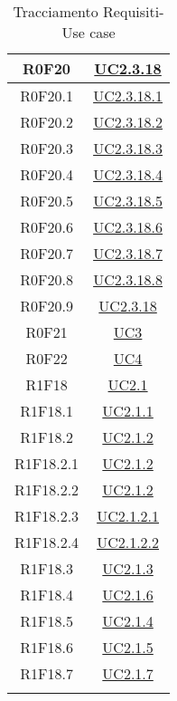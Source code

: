 \documentclass[../AnalisiDeiRequisiti.tex]{subfiles}
\begin{document}
\begin{longtable}{|c|c|}
	R0F20 & \hyperlink{UC2.3.18}{UC2.3.18}\\\hline
	R0F20.1 & \hyperlink{UC2.3.18.1}{UC2.3.18.1}\\\hline
	R0F20.2 & \hyperlink{UC2.3.18.2}{UC2.3.18.2}\\\hline
	R0F20.3 & \hyperlink{UC2.3.18.3}{UC2.3.18.3}\\\hline
	R0F20.4 & \hyperlink{UC2.3.18.4}{UC2.3.18.4}\\\hline
	R0F20.5 & \hyperlink{UC2.3.18.5}{UC2.3.18.5}\\\hline
	R0F20.6 & \hyperlink{UC2.3.18.6}{UC2.3.18.6}\\\hline
	R0F20.7 & \hyperlink{UC2.3.18.7}{UC2.3.18.7}\\\hline
	R0F20.8 & \hyperlink{UC2.3.18.8}{UC2.3.18.8}\\\hline
	R0F20.9 & \hyperlink{UC2.3.18}{UC2.3.18}\\\hline
	R0F21 & \hyperlink{UC3}{UC3}\\\hline
	R0F22 & \hyperlink{UC4}{UC4}\\\hline
	R1F18 & \hyperlink{UC2.1}{UC2.1}\\\hline
	R1F18.1 & \hyperlink{UC2.1.1}{UC2.1.1}\\\hline
	R1F18.2 & \hyperlink{UC2.1.2}{UC2.1.2}\\\hline
	R1F18.2.1 & \hyperlink{UC2.1.2}{UC2.1.2}\\\hline
	R1F18.2.2 & \hyperlink{UC2.1.2}{UC2.1.2}\\\hline
	R1F18.2.3 & \hyperlink{UC2.1.2.1}{UC2.1.2.1}\\\hline
	R1F18.2.4 & \hyperlink{UC2.1.2.2}{UC2.1.2.2}\\\hline
	R1F18.3 & \hyperlink{UC2.1.3}{UC2.1.3}\\\hline
	R1F18.4 & \hyperlink{UC2.1.6}{UC2.1.6}\\\hline
	R1F18.5 & \hyperlink{UC2.1.4}{UC2.1.4}\\\hline
	R1F18.6 & \hyperlink{UC2.1.5}{UC2.1.5}\\\hline
	R1F18.7 & \hyperlink{UC2.1.7}{UC2.1.7}\\\hline
	\caption[Tracciamento Requisiti-Use case]{Tracciamento Requisiti-Use case}
	\label{tabella:requi-usecase}
\end{longtable}
\clearpage
\end{document}
